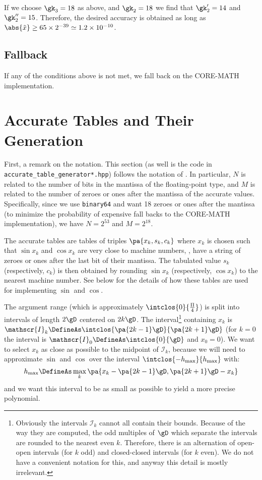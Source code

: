 \documentclass[10pt, a4paper, twoside]{basestyle}
\newcommand{\red}[1]{\tilde{#1}}
\begin{document}
If we choose $\gk_3 = 18$ as above, and $\gk_2 = 18$ we find that $\gk'_2 = 14$ and $\gk''_2 = 15$.  Therefore, the desired accuracy is obtained as long as $\abs{\red x} \geq 65 \times 2^{-39} \simeq 1.2 \times 10^{-10}$.

\subsection*{Fallback}

If any of the conditions above is not met, we fall back on the CORE-MATH implementation.

\section*{Accurate Tables and Their Generation}

First, a remark on the notation.  This section (as well is the code in \linebreak\texttt{accurate\_table\_generator*.hpp}) follows the notation of \cite{StehléZimmermann2005}.  In particular, $N$ is related to the number of bits in the mantissa of the floating-point type, and $M$ is related to the number of zeroes or ones after the mantissa of the accurate values.  Specifically, since we use \texttt{binary64} and want 18 zeroes or ones after the mantissa (to minimize the probability of expensive fall backs to the CORE-MATH implementation), we have $N = 2^{53}$ and $M = 2^{18}$. 

The accurate tables are tables of triples $\pa{x_k, s_k, c_k}$ where $x_k$ is chosen such that $\sin x_k$ and $\cos x_k$ are very close to machine numbers, \idest, have a string of zeroes or ones after the last bit of their mantissa.  The tabulated value $s_k$ (respectively, $c_k$) is then obtained by rounding $\sin x_k$ (respectively, $\cos x_k$) to the nearest machine number.  See  below for the details of how these tables are used for implementing $\sin$ and $\cos$.

The argument range (which is approximately $\intclos{0}{\frac{\Pi}{4}}$) is split into intervals of length $2 \gD$ centered on $2 k \gD$.  The interval\footnote{Obviously the intervals $\mathscr{I}_k$ cannot all contain their bounds.  Because of the way they are computed, the odd multiples of $\gD$ which separate the intervals are rounded to the nearest even $k$.  Therefore, there is an alternation of open-open intervals (for $k$ odd) and closed-closed intervals (for $k$ even).  We do not have a convenient notation for this, and anyway this detail is mostly irrelevant.} containing $x_k$ is $\mathscr{I}_k \DefineAs \intclos{\pa{2 k - 1}\gD}{\pa{2 k + 1}\gD}$ (for $k = 0$ the interval is $\mathscr{I}_0 \DefineAs \intclos{0}{\gD}$ and $x_0 = 0$).  We want to select $x_k$ as close as possible to the midpoint of $\mathscr{I}_k$, because we will need to approximate $\sin$ and $\cos$ over the interval $\intclos{-h_{\text{max}}}{h_{\text{max}}}$ with:
\[
h_{\text{max}} \DefineAs \max_k \pa{x_k - \pa{2 k - 1} \gD, \pa{2 k + 1} \gD - x_k}
\]
and we want this interval to be as small as possible to yield a more precise polynomial.
\end{document}
